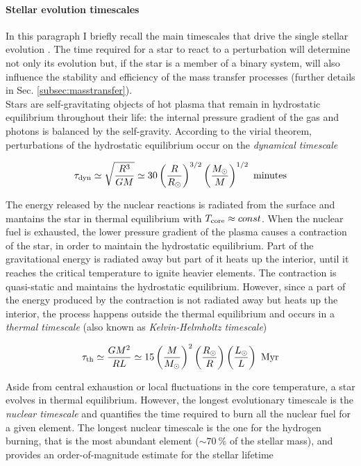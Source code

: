 \documentclass[a4paper,titlepage]{book}     	%
\newcommand{\sun}{\ensuremath{_\odot}}
\begin{document}
\paragraph{Stellar evolution timescales} In this paragraph I briefly recall the main timescales that drive the single stellar evolution \cite{evostellare}. The time required for a star to react to a perturbation will determine not only its evolution but, if the star is a member of a binary system, will also influence the stability and efficiency of the mass transfer processes (further details in Sec. \ref{subsec:masstransfer}). \\

Stars are self-gravitating objects of hot plasma that remain in hydrostatic equilibrium throughout their life: the internal pressure gradient of the gas and photons is balanced by the self-gravity. According to the virial theorem, perturbations of the hydrostatic equilibrium occur on the \emph{dynamical timescale}

\begin{equation}\label{eq:taudyn}
\tau_\textup{dyn} \simeq \sqrt{\frac{R^3}{G M}} \simeq 30 \left(\frac{R}{R\sun}\right)^{3/2} \left(\frac{M\sun}{M}\right)^{1/2}\ \text{minutes}
\end{equation}


The energy released by the nuclear reactions is radiated from the surface and mantains the star in thermal equilibrium with $T_{\rm core} \approx const$. When the nuclear fuel is exhausted, the lower pressure gradient of the plasma causes a contraction of the star, in order to maintain the hydrostatic equilibrium. Part of the gravitational energy is radiated away but part of it heats up the interior, until it reaches the critical temperature to ignite heavier elements. The contraction is quasi-static and maintains the hydrostatic equilibrium. However, since a part of the energy produced by the contraction is not radiated away but heats up the interior, the process happens outside the thermal equilibrium and occurs in a \emph{thermal timescale} (also known as \emph{Kelvin-Helmholtz timescale})

\begin{equation}\label{eq:tauth}
\tau_\textup{th} \simeq \frac{G M^2}{R L} \simeq 15 
\left(\frac{M}{M\sun}\right)^{2} \left(\frac{R\sun}{R}\right) \left(\frac{L\sun}{L}\right)\ \text{Myr}
\end{equation}

Aside from central exhaustion or local fluctuations in the core temperature, a star evolves in thermal equilibrium. However, the longest evolutionary timescale is the \emph{nuclear timescale} and quantifies the time required to burn all the nuclear fuel for a given element. The longest nuclear timescale is the one for the hydrogen burning, that is the most abundant element ($\sim 70~\%$ of the stellar mass), and provides an order-of-magnitude estimate for the stellar lifetime
\end{document}
